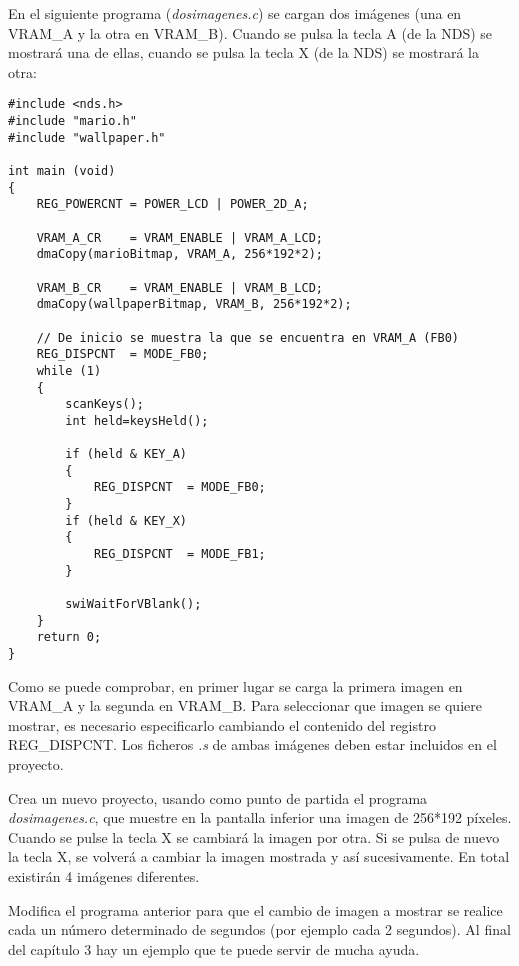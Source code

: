 \begin{example}
En el siguiente programa (\textit{dosimagenes.c}) se cargan dos imágenes (una en VRAM\_A y la otra en VRAM\_B). Cuando se pulsa la tecla A (de la NDS) se mostrará una de ellas, cuando se pulsa la tecla X (de la NDS) se mostrará la otra:

\begin{lstlisting}
#include <nds.h>
#include "mario.h"
#include "wallpaper.h"

int main (void)
{
	REG_POWERCNT = POWER_LCD | POWER_2D_A;
	
	VRAM_A_CR    = VRAM_ENABLE | VRAM_A_LCD;
	dmaCopy(marioBitmap, VRAM_A, 256*192*2);
	
	VRAM_B_CR    = VRAM_ENABLE | VRAM_B_LCD;
	dmaCopy(wallpaperBitmap, VRAM_B, 256*192*2);
	
	// De inicio se muestra la que se encuentra en VRAM_A (FB0)
	REG_DISPCNT  = MODE_FB0;
	while (1)
	{
		scanKeys();
		int held=keysHeld();
		
		if (held & KEY_A)
		{
			REG_DISPCNT  = MODE_FB0;
		}
		if (held & KEY_X)
		{
			REG_DISPCNT  = MODE_FB1;
		}
		
		swiWaitForVBlank();
	}
	return 0;
}
\end{lstlisting}
\end{example}

Como se puede comprobar, en primer lugar se carga la primera imagen en VRAM\_A y la segunda en VRAM\_B. Para seleccionar que imagen se quiere mostrar, es necesario especificarlo cambiando el contenido del registro REG\_DISPCNT. Los ficheros \textit{.s} de ambas imágenes deben estar incluidos en el proyecto.

\begin{exercise}
Crea un nuevo proyecto, usando como punto de partida el programa \textit{dosimagenes.c}, que muestre en la pantalla inferior una imagen de 256*192 píxeles. Cuando se pulse la tecla X se cambiará la imagen por otra. Si se pulsa de nuevo la tecla X, se volverá a cambiar la imagen mostrada y así sucesivamente. En total existirán 4 imágenes diferentes.
\end{exercise}

\begin{exercise}
Modifica el programa anterior para que el cambio de imagen a mostrar se realice cada un número determinado de segundos (por ejemplo cada 2 segundos). Al final del capítulo 3 hay un ejemplo que te puede servir de mucha ayuda.
\end{exercise}
	
